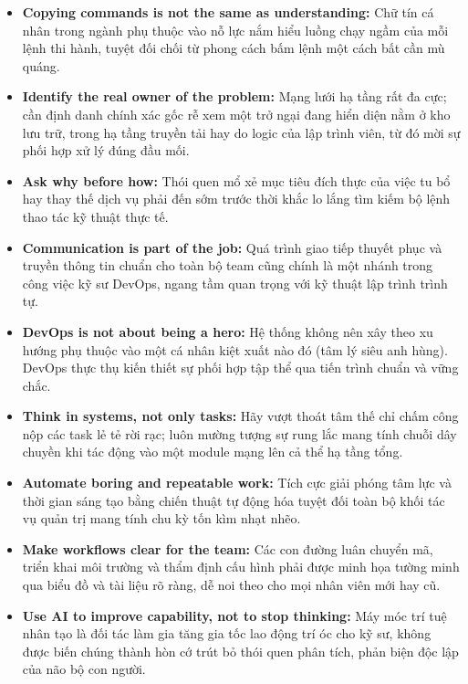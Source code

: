 \begin{itemize}
\tightlist
\item
  \textbf{Copying commands is not the same as understanding:} Chữ tín cá
  nhân trong ngành phụ thuộc vào nỗ lực nắm hiểu luồng chạy ngầm của mỗi
  lệnh thi hành, tuyệt đối chối từ phong cách bấm lệnh một cách bất cần
  mù quáng.
\item
  \textbf{Identify the real owner of the problem:} Mạng lưới hạ tầng rất
  đa cực; cần định danh chính xác gốc rễ xem một trở ngại đang hiển diện
  nằm ở kho lưu trữ, trong hạ tầng truyền tải hay do logic của lập trình
  viên, từ đó mời sự phối hợp xử lý đúng đầu mối.
\item
  \textbf{Ask why before how:} Thói quen mổ xẻ mục tiêu đích thực của
  việc tu bổ hay thay thế dịch vụ phải đến sớm trước thời khắc lo lắng
  tìm kiếm bộ lệnh thao tác kỹ thuật thực tế.
\item
  \textbf{Communication is part of the job:} Quá trình giao tiếp thuyết
  phục và truyền thông tin chuẩn cho toàn bộ team cũng chính là một
  nhánh trong công việc kỹ sư DevOps, ngang tầm quan trọng với kỹ thuật
  lập trình trình tự.
\item
  \textbf{DevOps is not about being a hero:} Hệ thống không nên xây theo
  xu hướng phụ thuộc vào một cá nhân kiệt xuất nào đó (tâm lý siêu anh
  hùng). DevOps thực thụ kiến thiết sự phối hợp tập thể qua tiến trình
  chuẩn và vững chắc.
\item
  \textbf{Think in systems, not only tasks:} Hãy vượt thoát tâm thế chỉ
  chấm công nộp các task lẻ tẻ rời rạc; luôn mường tượng sự rung lắc
  mang tính chuỗi dây chuyền khi tác động vào một module mạng lên cả thể
  hạ tầng tổng.
\item
  \textbf{Automate boring and repeatable work:} Tích cực giải phóng tâm
  lực và thời gian sáng tạo bằng chiến thuật tự động hóa tuyệt đối toàn
  bộ khối tác vụ quản trị mang tính chu kỳ tốn kìm nhạt nhẽo.
\item
  \textbf{Make workflows clear for the team:} Các con đường luân chuyển
  mã, triển khai môi trường và thẩm định cấu hình phải được minh họa
  tường minh qua biểu đồ và tài liệu rõ ràng, dễ noi theo cho mọi nhân
  viên mới hay cũ.
\item
  \textbf{Use AI to improve capability, not to stop thinking:} Máy móc
  trí tuệ nhân tạo là đối tác làm gia tăng gia tốc lao động trí óc cho
  kỹ sư, không được biến chúng thành hòn cớ trút bỏ thói quen phân tích,
  phản biện độc lập của não bộ con người.
\end{itemize}

